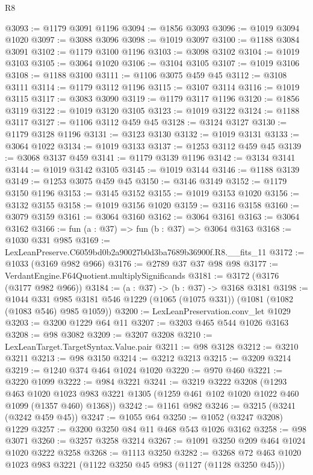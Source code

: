 \begin{lexlean}{R8}
\begin{coremodule}
@3093 := @1179 @3091 @1196
@3094 := @1856 @3093
@3096 := @1019 @3094 @1020
@3097 := @3088 @3096
@3098 := @1019 @3097
@3100 := @1188 @3084 @3091
@3102 := @1179 @3100 @1196
@3103 := @3098 @3102
@3104 := @1019 @3103
@3105 := @3064 @1020
@3106 := @3104 @3105
@3107 := @1019 @3106
@3108 := @1188 @3100
@3111 := @1106 @3075 @459 @45
@3112 := @3108 @3111
@3114 := @1179 @3112 @1196
@3115 := @3107 @3114
@3116 := @1019 @3115
@3117 := @3083 @3090
@3119 := @1179 @3117 @1196
@3120 := @1856 @3119
@3122 := @1019 @3120 @3105
@3123 := @1019 @3122
@3124 := @1188 @3117
@3127 := @1106 @3112 @459 @45
@3128 := @3124 @3127
@3130 := @1179 @3128 @1196
@3131 := @3123 @3130
@3132 := @1019 @3131
@3133 := @3064 @1022
@3134 := @1019 @3133
@3137 := @1253 @3112 @459 @45
@3139 := @3068 @3137 @459
@3141 := @1179 @3139 @1196
@3142 := @3134 @3141
@3144 := @1019 @3142 @3105
@3145 := @1019 @3144
@3146 := @1188 @3139
@3149 := @1253 @3075 @459 @45
@3150 := @3146 @3149
@3152 := @1179 @3150 @1196
@3153 := @3145 @3152
@3155 := @1019 @3153 @1020
@3156 := @3132 @3155
@3158 := @1019 @3156 @1020
@3159 := @3116 @3158
@3160 := @3079 @3159
@3161 := @3064 @3160
@3162 := @3064 @3161
@3163 := @3064 @3162
@3166 := fun (a : @37) => fun (b : @37) => @3064 @3163
@3168 := @1030 @331 @985
@3169 := LexLeanPreserve.C6059bd0b2a90027b0d3ba7689b36900f.R8.__fits_11
@3172 := @1033 (@3169 @982 @966)
@3176 := @2789 @37 @37 @98 @98
@3177 := VerdantEngine.F64Quotient.multiplySignificands
@3181 := @3172 (@3176 (@3177 @982 @966))
@3184 := (a : @37) -> (b : @37) -> @3168 @3181
@3198 := @1044
    @331
    @985
    @3181
    @546
    @1229
    (@1065 (@1075 @331))
    (@1081 (@1082 (@1083 @546) @985 @1059))
@3200 := LexLeanPreservation.conv_let @1029
@3203 := @3200 @1229 @64 @11
@3207 := @3203 @465 @544 @1026 @3163
@3208 := @98 @3082
@3209 := @3207 @3208
@3210 := LexLeanTarget.TargetSyntax.Value.pair
@3211 := @98 @3128
@3212 := @3210 @3211
@3213 := @98 @3150
@3214 := @3212 @3213
@3215 := @3209 @3214
@3219 := @1240 @374 @464 @1024 @1020
@3220 := @970 @460
@3221 := @3220 @1099
@3222 := @984 @3221
@3241 := @3219
    @3222
    @3208
    (@1293
      @463
      @1020
      @1023
      @983
      @3221
      @1305
      (@1259 @461 @102 @1020 @1022 @460 @1099 (@1357 @460) @1368))
@3242 := @1161 @982
@3246 := @3215 (@3241 (@3242 @459 @45))
@3247 := @1055 @64
@3250 := @1052 (@3247 @3208) @1229
@3257 := @3200 @3250 @84 @11 @468 @543 @1026 @3162
@3258 := @98 @3071
@3260 := @3257 @3258 @3214
@3267 := @1091 @3250 @209 @464 @1024 @1020 @3222 @3258
@3268 := @1113 @3250
@3282 := @3268 @72 @463 @1020 @1023 @983 @3221 (@1122 @3250 @45 @983 (@1127 (@1128 @3250 @45)))

\end{coremodule}
\end{lexlean}
